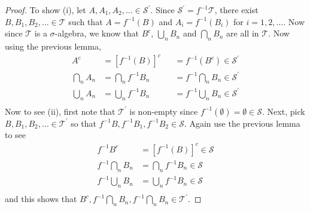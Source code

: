 \documentclass{amsart}
\theoremstyle{remark}
\theoremstyle{definition}
\begin{document}
\begin{proof}
To show (i), let $A,A_1,A_2,\dots \in \mathcal{S}^\prime$.  Since
$\mathcal{S}^\prime = f^{-1}\mathcal{T}$, there exist $B,B_1,B_2,\dots
\in \mathcal{T}$ such that $A = f^{-1}(B)$ and $A_i = f^{-1}(B_i)$ for
$i=1,2,\dots$.  Now since $\mathcal{T}$ is a $\sigma$-algebra, we know
that $B^c$, $\bigcup_n B_n$ and $\bigcap_n B_n$ are all in
$\mathcal{T}$.  Now using the previous lemma,
\begin{align*}
A^c &= \left[f^{-1}(B)\right]^c &&= f^{-1}(B^c) \in
\mathcal{S}^\prime\\
\bigcap_n A_n &= \bigcap_n f^{-1}B_n &&= f^{-1} \bigcap_n B_n \in
\mathcal{S}^\prime \\
\bigcup_n A_n &= \bigcup_n f^{-1}B_n &&= f^{-1} \bigcup_n B_n \in
\mathcal{S}^\prime \\
\end{align*}
Now to see (ii), first note that $\mathcal{T}^\prime$ is non-empty
since $f^{-1} (\emptyset) = \emptyset \in \mathcal{S}$.  Next, pick $B,B_1,B_2,\dots \in \mathcal{T}^\prime$ so that
$f^{-1}B,f^{-1}B_1,f^{-1}B_2 \in \mathcal{S}$.  Again use the previous
lemma to see
\begin{align*}
f^{-1} B^c &= \left[f^{-1}(B)\right]^c \in
\mathcal{S}\\
f^{-1} \bigcap_n B_n &= \bigcap_n f^{-1}B_n \in
\mathcal{S} \\
f^{-1} \bigcup_n B_n &= \bigcup_n f^{-1}B_n \in
\mathcal{S} \\
\end{align*}
and this shows that $B^c,f^{-1} \bigcap_n B_n, f^{-1} \bigcap_n B_n
\in \mathcal{T}^\prime$.
\end{proof}
\end{document}
